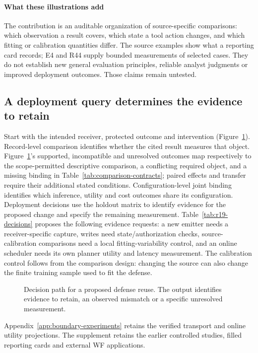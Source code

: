 \paragraph{What these illustrations add}
The contribution is an auditable organization of source-specific comparisons: which observation a result covers, which state a tool action changes, and which fitting or calibration quantities differ. The source examples show what a reporting card records; E4 and R44 supply bounded measurements of selected cases. They do not establish new general evaluation principles, reliable analyst judgments or improved deployment outcomes. Those claims remain untested.

\subsection{A deployment query determines the evidence to retain}
Start with the intended receiver, protected outcome and intervention (Figure~\ref{fig:main-decision}). Record-level comparison identifies whether the cited result measures that object. Figure~\ref{fig:main-decision}'s supported, incompatible and unresolved outcomes map respectively to the scope-permitted descriptive comparison, a conflicting required object, and a missing binding in Table~\ref{tab:comparison-contracts}; paired effects and transfer require their additional stated conditions. Configuration-level joint binding identifies which inference, utility and cost outcomes share its configuration. Deployment decisions use the holdout matrix to identify evidence for the proposed change and specify the remaining measurement. Table~\ref{tab:r19-decisions} proposes the following evidence requests: a new emitter needs a receiver-specific capture, writes need state/authorization checks, source-calibration comparisons need a local fitting-variability control, and an online scheduler needs its own planner utility and latency measurement. The calibration control follows from the comparison design: changing the source can also change the finite training sample used to fit the defense.

\begin{figure}[t]\centering

\caption{Decision path for a proposed defense reuse. The output identifies evidence to retain, an observed mismatch or a specific unresolved measurement.}\label{fig:main-decision}
\end{figure}

Appendix~\ref{app:boundary-experiments} retains the verified transport and online utility projections. The supplement retains the earlier controlled studies, filled reporting cards and external WF applications.
